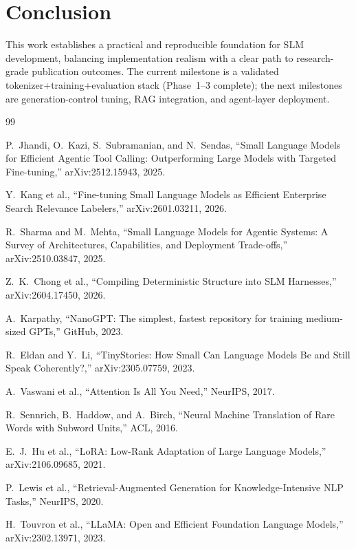 \documentclass[11pt]{article}
\begin{document}
\section{Conclusion}
This work establishes a practical and reproducible foundation for SLM development, balancing implementation realism with a clear path to research-grade publication outcomes. The current milestone is a validated tokenizer+training+evaluation stack (Phase~1--3 complete); the next milestones are generation-control tuning, RAG integration, and agent-layer deployment.

\begin{thebibliography}{99}

P.~Jhandi, O.~Kazi, S.~Subramanian, and N.~Sendas,
\newblock ``Small Language Models for Efficient Agentic Tool Calling: Outperforming Large Models with Targeted Fine-tuning,''
\newblock arXiv:2512.15943, 2025.

Y.~Kang et al.,
\newblock ``Fine-tuning Small Language Models as Efficient Enterprise Search Relevance Labelers,''
\newblock arXiv:2601.03211, 2026.

R.~Sharma and M.~Mehta,
\newblock ``Small Language Models for Agentic Systems: A Survey of Architectures, Capabilities, and Deployment Trade-offs,''
\newblock arXiv:2510.03847, 2025.

Z.~K.~Chong et al.,
\newblock ``Compiling Deterministic Structure into SLM Harnesses,''
\newblock arXiv:2604.17450, 2026.

A.~Karpathy,
\newblock ``NanoGPT: The simplest, fastest repository for training medium-sized GPTs,''
\newblock GitHub, 2023.

R.~Eldan and Y.~Li,
\newblock ``TinyStories: How Small Can Language Models Be and Still Speak Coherently?,''
\newblock arXiv:2305.07759, 2023.

A.~Vaswani et al.,
\newblock ``Attention Is All You Need,''
\newblock NeurIPS, 2017.

R.~Sennrich, B.~Haddow, and A.~Birch,
\newblock ``Neural Machine Translation of Rare Words with Subword Units,''
\newblock ACL, 2016.

E.~J.~Hu et al.,
\newblock ``LoRA: Low-Rank Adaptation of Large Language Models,''
\newblock arXiv:2106.09685, 2021.

P.~Lewis et al.,
\newblock ``Retrieval-Augmented Generation for Knowledge-Intensive NLP Tasks,''
\newblock NeurIPS, 2020.

H.~Touvron et al.,
\newblock ``LLaMA: Open and Efficient Foundation Language Models,''
\newblock arXiv:2302.13971, 2023.

\end{thebibliography}
\end{document}
